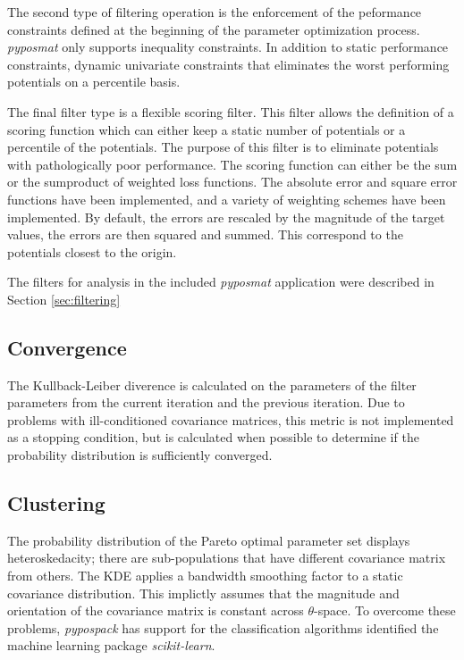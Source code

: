 The second type of filtering operation is the enforcement of the peformance constraints defined at the beginning of the parameter optimization process.  \emph{pyposmat} only supports inequality constraints.  In addition to static performance constraints, dynamic univariate constraints that eliminates the worst performing potentials on a percentile basis.

The final filter type is a flexible scoring filter.  This filter allows the definition of a scoring function which can either keep a static number of potentials or a percentile of the potentials.  The purpose of this filter is to eliminate potentials with pathologically poor performance.  The scoring function can either be the sum or the sumproduct of weighted loss functions.  The absolute error and square error functions have been implemented, and a variety of weighting schemes have been implemented.  By default, the errors are rescaled by the magnitude of the target values, the errors are then squared and summed.  This correspond to the potentials closest to the origin.

The filters for analysis in the included \emph{pyposmat} application were described in Section \ref{sec:filtering}

\subsection{Convergence}

The Kullback-Leiber diverence is calculated on the parameters of the filter parameters from the current iteration and the previous iteration.  Due to problems with ill-conditioned covariance matrices, this metric is not implemented as a stopping condition, but is calculated when possible to determine if the probability distribution is sufficiently converged.

\subsection{Clustering}

The probability distribution of the Pareto optimal parameter set displays heteroskedacity; there are sub-populations that have different covariance matrix from others.  The KDE applies a bandwidth smoothing factor to a static covariance distribution.  This implictly assumes that the magnitude and orientation of the covariance matrix is constant across $\theta$-space.  To overcome these problems, \emph{pypospack} has support for the classification algorithms identified the machine learning package \emph{scikit-learn}.

